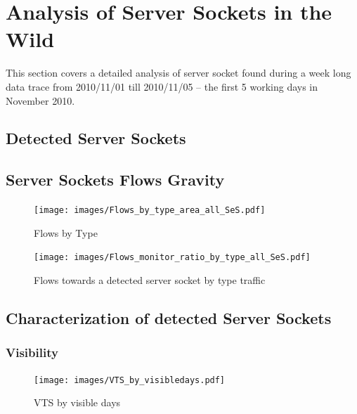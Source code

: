 \newpage
\section{Analysis of Server Sockets in the Wild}

This section covers a detailed analysis of server socket found during a week long data trace from 2010/11/01 till 2010/11/05 -- the first 5 working days in November 2010.

\subsection{Detected Server Sockets}



\subsection{Server Sockets Flows Gravity}


\begin{figure}
	[ht] \centering 
	\texttt{[image: images/Flows\_by\_type\_area\_all\_SeS.pdf]}
	\caption{Flows by Type} 
	\label{fig:flows_by_type} 
\end{figure}


\begin{figure}
	[ht] \centering 
	\texttt{[image: images/Flows\_monitor\_ratio\_by\_type\_all\_SeS.pdf]}
	\caption{Flows towards a detected server socket by type traffic} 
	\label{fig:monitored_flows_by_type} 
\end{figure}


\subsection{Characterization of detected Server Sockets}

\subsubsection{Visibility}
\begin{figure}
	[ht] \centering 
	\texttt{[image: images/VTS\_by\_visibledays.pdf]}
	\caption{VTS by visible days} 
	\label{fig:vts_by_visibledays} 
\end{figure}

